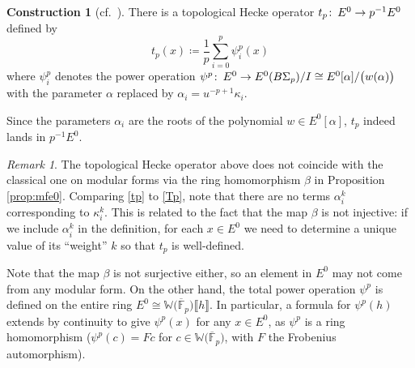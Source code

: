 \documentclass{gtpart}
\theoremstyle{definition}
\newtheorem{cstr}[thm]{Construction}
\theoremstyle{remark}
\newtheorem{rmk}[thm]{Remark}
\def\co{\colon\thinspace}
\newcommand{\mb}[1]{\mathbb{#1}}
\newcommand{\cF}{\overline {\mb F}}
\newcommand{\BW}{{\mb W}}
\newcommand{\A}{\alpha}
\newcommand{\B}{\beta}
\newcommand{\K}{\kappa}
\newcommand{\ce}{\coloneqq}
\newcommand{\lb}{\llbracket}
\newcommand{\rb}{\rrbracket}
\renewcommand{\=}{\approx}
\renewcommand{\-}{\sim}
\numberwithin{equation}{section}
\numberwithin{thm}{section}
\begin{document}
\begin{cstr}[{cf.~\cite[1.12]{log}}]
 \label{cstr:tp}
 There is a topological Hecke operator $t_p \co E^0 \to p^{-1} E^0$ defined by 
 \begin{equation}
  \label{tp}
  t_p(x) \ce \frac{1}{p} \sum_{i=0}^p \psi^p_i(x) 
 \end{equation}
 where $\psi^p_i$ denotes the power operation $\psi^p \co E^0 \to E^0(B\Sigma_p) / I \cong E^0[\A] / \big( w(\A) \big)$ with the parameter $\A$ replaced by $\A_i = u^{-p + 1} \K_i$.  
\end{cstr}
Since the parameters $\A_i$ are the roots of the polynomial $w \in E^0[\A]$, 
$t_p$ indeed lands in $p^{-1} E^0$.  
\begin{rmk}
 \label{rmk:tc}
 The topological Hecke operator above does not coincide with the classical one on modular forms via the ring homomorphism $\B$ in Proposition \ref{prop:mfe0}.  
 Comparing \eqref{tp} to \eqref{Tp}, note that there are no terms $\A_i^k$ corresponding to $\K_i^k$.  
 This is related to the fact that the map $\B$ is not injective: 
 if we include $\A_i^k$ in the definition, for each $x \in E^0$ we need to determine a unique value of its ``weight'' $k$ so that $t_p$ is well-defined.  

 Note that the map $\B$ is not surjective either, so an element in $E^0$ may not come from any modular form.  
 On the other hand, the total power operation $\psi^p$ is defined on the entire ring $E^0 \cong \BW \big( \cF_p \big) \lb h \rb$.  
 In particular, a formula for $\psi^p(h)$ extends by continuity to give $\psi^p(x)$ for any $x \in E^0$, as $\psi^p$ is a ring homomorphism 
 ($\psi^p(c) = F c$ for $c \in \BW \big( \cF_p \big)$, with $F$ the Frobenius automorphism).  
\end{rmk}
\end{document}
